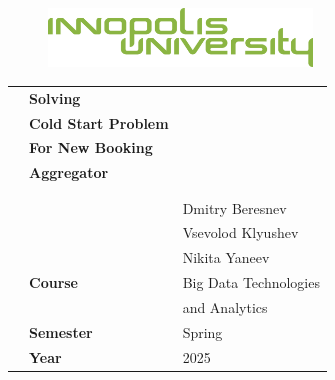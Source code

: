 \begin{center}

\vspace*{1cm}

\begin{figure}
  \raggedleft
  \begin{minipage}{5cm}
  \includegraphics[width=7cm]{images/logo.png}
  \end{minipage}
\end{figure}

\vspace*{2cm}

\vspace*{0.1in}

\begin{spacing}{1.7}

\begin{tabular}{p{3cm} l l}

& \textbf{\huge Solving}\\ %
& \textbf{\huge Cold Start Problem}\\
& \textbf{\huge For New Booking}\\
& \textbf{\huge Aggregator}\\
& \\
& \\
& \large \multirow{3}{*}{\textbf{Students}} & \large Dmitry Beresnev \\
& & \large Vsevolod Klyushev \\
& & \large Nikita Yaneev \\
& \large \textbf{Course} & \large Big Data Technologies\\
& \large \textbf{} & \large and Analytics\\
& \large \textbf{Semester} & \large Spring \\
& \large \textbf{Year} & \large 2025 \\
\end{tabular}

\end{spacing}

\end{center}

